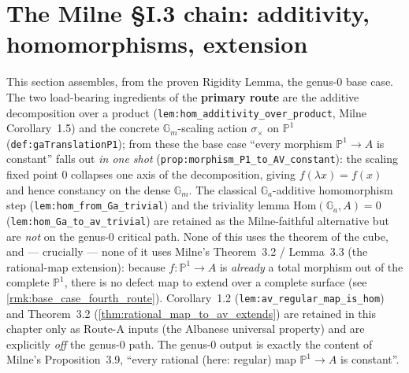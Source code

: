 \section{The Milne \S I.3 chain: additivity, homomorphisms, extension}
This section assembles, from the proven Rigidity Lemma, the genus-\(0\) base case. The two
load-bearing ingredients of the \textbf{primary route} are the additive decomposition over a
product (\texttt{lem:hom_additivity_over_product}, Milne Corollary~1.5) and the concrete \(\mathbb
G_m\)-scaling action \(\sigma_\times\) on \(\mathbb P^1\) (\texttt{def:gaTranslationP1}); from these
the base case ``every morphism \(\mathbb P^1 \to A\) is constant'' falls out \emph{in one shot}
(\texttt{prop:morphism_P1_to_AV_constant}): the scaling fixed point \(0\) collapses one axis of the
decomposition, giving \(f(\lambda x) = f(x)\) and hence constancy on the dense \(\mathbb G_m\). The
classical \(\mathbb G_a\)-additive homomorphism step
(\texttt{lem:hom_from_Ga_trivial}) and the triviality lemma \(\mathrm{Hom}(\mathbb G_a, A) = 0\)
(\texttt{lem:hom_Ga_to_av_trivial}) are retained as the Milne-faithful alternative but are
\emph{not} on the genus-\(0\) critical path. None of this uses the theorem of the cube, and --- crucially
--- none of it uses Milne's Theorem~3.2 / Lemma~3.3 (the rational-map extension): because \(f
\colon \mathbb P^1 \to A\) is \emph{already} a total morphism out of the complete \(\mathbb
P^1\), there is no defect map to extend over a complete surface (see
\cref{rmk:base_case_fourth_route}). Corollary~1.2 (\texttt{lem:av_regular_map_is_hom}) and
Theorem~3.2 (\cref{thm:rational_map_to_av_extends}) are retained in this chapter only as
Route-A inputs (the Albanese universal property) and are explicitly \emph{off} the genus-\(0\)
path. The genus-\(0\) output is exactly the content of Milne's Proposition~3.9, ``every rational
(here: regular) map \(\mathbb P^1 \to A\) is constant''.
